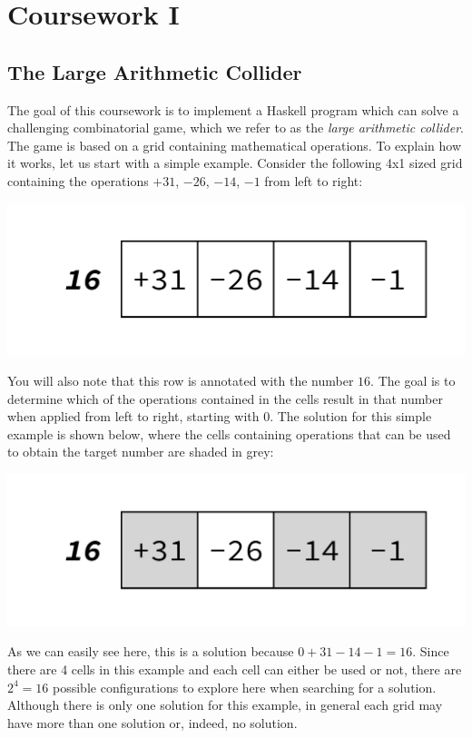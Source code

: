 
\newcommand{\deadlineOneTime}{noon}
\newcommand{\deadlineOneDate}{6 February 2020}
\newcommand{\submissionOneURL}{https://tabula.warwick.ac.uk/coursework/submission/0d913a74-f440-4f72-afd4-d84cb6ada99a}



\cleardoublepage
\chapter{Coursework I}

\section{The Large Arithmetic Collider}

The goal of this coursework is to implement a Haskell program which can solve a challenging combinatorial game, which we refer to as the \emph{large arithmetic collider}. The game is based on a grid containing mathematical operations. To explain how it works, let us start with a simple example. Consider the following 4x1 sized grid containing the operations $+31$, $-26$, $-14$, $-1$ from left to right:
\begin{center}
	\includegraphics[scale=0.4,trim=0 30 0 30]{cswk/lac1.pdf}
\end{center}
You will also note that this row is annotated with the number $16$. The goal is to determine which of the operations contained in the cells result in that number when applied from left to right, starting with $0$. The solution for this simple example is shown below, where the cells containing operations that can be used to obtain the target number are shaded in grey:
\begin{center}
	\includegraphics[scale=0.4,trim=0 30 0 30]{cswk/lac1s.pdf}
\end{center}
As we can easily see here, this is a solution because $0+31-14-1=16$. Since there are 4 cells in this example and each cell can either be used or not, there are $2^4=16$ possible configurations to explore here when searching for a solution. Although there is only one solution for this example, in general each grid may have more than one solution or, indeed, no solution. 

